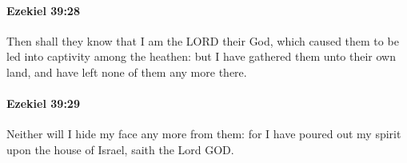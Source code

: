 		\paragraph{Ezekiel 39:28} %
			\label{EZEKIEL-39-28}

			Then shall they know that I am the LORD their God, which caused them to be led into captivity among the heathen: but I have gathered them unto their own land, and have left none of them any more there.


		\paragraph{Ezekiel 39:29} %
			\label{EZEKIEL-39-29}

			Neither will I hide my face any more from them: for I have poured out my spirit upon the house of Israel, saith the Lord GOD.


